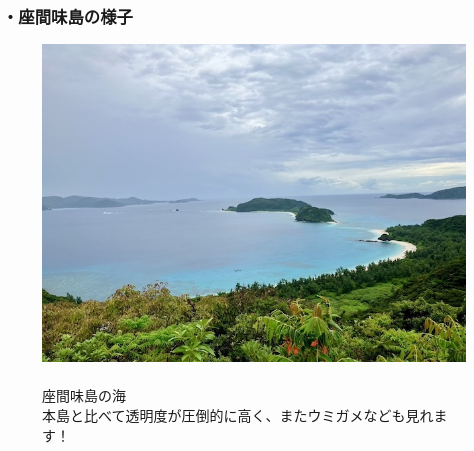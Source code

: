 \documentclass[../main]{subfiles}
\begin{document}
\subsubsection*{・座間味島の様子}
\begin{figure}[H]
  \begin{minipage}[b]{0.48\columnwidth}
    \centering
    \includegraphics[width=0.85\columnwidth]{figure/zamamiumi.jpg}
  \end{minipage}
  \hspace{0.04\columnwidth} %
  \begin{minipage}[b]{0.48\columnwidth}
    \caption{\\
    座間味島の海\\
    本島と比べて透明度が圧倒的に高く、またウミガメなども見れます！
    }
  \end{minipage}
\end{figure}
\end{document}
